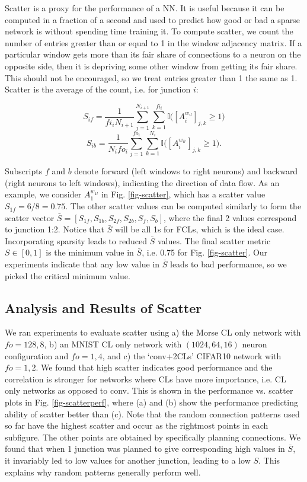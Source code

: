 \documentclass[conference]{IEEEtran}
\begin{document}
Scatter is a proxy for the performance of a NN. It is useful because it can be computed in a fraction of a second and used to predict how good or bad a sparse network is without spending time training it. To compute scatter, we count the number of entries greater than or equal to 1 in the window adjacency matrix. If a particular window gets more than its fair share of connections to a neuron on the opposite side, then it is depriving some other window from getting its fair share. This should not be encouraged, so we treat entries greater than 1 the same as 1. Scatter is the average of the count, i.e. for junction $i$:

\begin{equation}
S_{if} = \frac{1}{fi_iN_{i+1}}\sum_{j=1}^{N_{i+1}} \sum_{k=1}^{fi_i} \mathbb{I}\Big([A_i^{w_{il}}]_{j,k}\geq 1\Big)
\end{equation}
\begin{equation}
S_{ib} = \frac{1}{N_ifo_i}\sum_{j=1}^{fo_i} \sum_{k=1}^{N_i} \mathbb{I}\Big([A_i^{w_{ir}}]_{j,k}\geq 1\Big).
\end{equation}

Subscripts $f$ and $b$ denote forward (left windows to right neurons) and backward (right neurons to left windows), indicating the direction of data flow. %
As an example, we consider $A_1^{w_{1l}}$ in Fig. \ref{fig-scatter}, which has a scatter value $S_{1f} = 6/8 = 0.75$. The other scatter values can be computed similarly to form the scatter vector $\bar{S} = [S_{1f},S_{1b},S_{2f},S_{2b},S_{f},S_{b}]$, where the final 2 values correspond to junction 1:2. Notice that $\bar{S}$ will be all 1s for FCLs, which is the ideal case. Incorporating sparsity leads to reduced $\bar{S}$ values. The final scatter metric $S \in [0,1]$ is the minimum value in $\bar{S}$, i.e. 0.75 for Fig. \ref{fig-scatter}. Our experiments indicate that any low value in $\bar{S}$ leads to bad performance, so we picked the critical minimum value.

\subsection{Analysis and Results of Scatter}\label{anares-scatter}
We ran experiments to evaluate scatter using a) the Morse CL only network with $fo = 128, 8$, b) an MNIST CL only network with $(1024,64,16)$ neuron configuration and $fo=1,4$, and c) the `conv+2CLs' CIFAR10 network with $fo = 1, 2$. We found that high scatter indicates good performance and the correlation is stronger for networks where CLs have more importance, i.e. CL only networks as opposed to conv. This is shown in the performance vs. scatter plots in Fig. \ref{fig-scatterperf}, where (a) and (b) show the performance predicting ability of scatter better than (c). Note that the random connection patterns used so far have the highest scatter and occur as the rightmost points in each subfigure. The other points are obtained by specifically planning connections. We found that when 1 junction was planned to give corresponding high values in $\bar{S}$, it invariably led to low values for another junction, leading to a low $S$. This explains why random patterns generally perform well.
\end{document}
